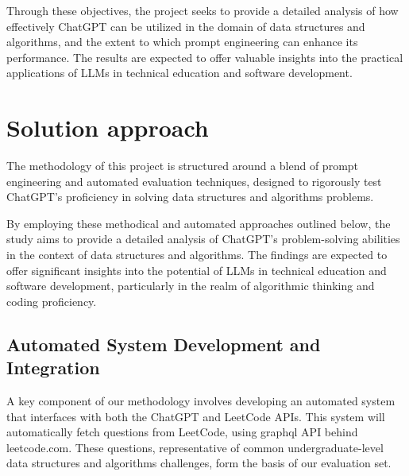 Through these objectives, the project seeks to provide a detailed analysis of how effectively 
ChatGPT can be utilized in the domain of data structures and algorithms, and the extent to 
which prompt engineering can enhance its performance. The results are expected to offer 
valuable insights into the practical applications of LLMs in technical education and software 
development.









\section{Solution approach}
\label{sec:intro_sol} %

The methodology of this project is structured around a blend of prompt engineering and 
automated evaluation techniques, designed to rigorously test ChatGPT's proficiency in solving 
data structures and algorithms problems.

By employing these methodical and automated approaches outlined below, the study aims to 
provide a detailed analysis of ChatGPT's problem-solving abilities in the context of data 
structures and algorithms. The findings are expected to offer significant insights into the 
potential of LLMs in technical education and software development, particularly in the realm of 
algorithmic thinking and coding proficiency.

\subsection{Automated System Development and Integration}
\label{sec:Leetcode}
A key component of our methodology involves developing an automated system that interfaces with 
both the ChatGPT and LeetCode APIs. This system will automatically fetch questions from 
LeetCode, using graphql API behind leetcode.com. These questions, 
representative of common undergraduate-level data structures and algorithms challenges, form 
the basis of our evaluation set.

